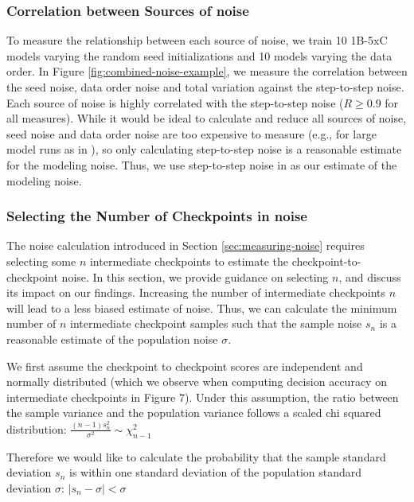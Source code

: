 \subsubsection{Correlation between Sources of noise{}}
\label{app:measuring-noise-sources}

To measure the relationship between each source of noise{}, we train 10 1B-5xC models varying the random seed initializations and 10 models varying the data order. In Figure \ref{fig:combined-noise-example}, we measure the correlation between the seed noise{}, data order noise{} and total variation against the step-to-step noise{}. Each source of noise{} is highly correlated with the step-to-step noise{} ($R\ge0.9$ for all measures). While it would be ideal to calculate and reduce all sources of noise{}, seed noise{} and data order noise{} are too expensive to measure (e.g., for large model runs as in \citet{madaan2024quantifying}), so only calculating step-to-step noise{} is a reasonable estimate for the modeling noise{}. Thus, we use step-to-step noise{} in as our estimate of the modeling noise.

\subsubsection{Selecting the Number of Checkpoints in noise{}}
\label{app:selecting-n-in-noise}

The noise calculation introduced in Section \ref{sec:measuring-noise} requires selecting some $n$ intermediate checkpoints to estimate the checkpoint-to-checkpoint noise. In this section, we provide guidance on selecting $n$, and discuss its impact on our findings. Increasing the number of intermediate checkpoints $n$ will lead to a less biased estimate of noise. Thus, we can calculate the minimum number of $n$ intermediate checkpoint samples such that the sample noise $s_n$ is a reasonable estimate of the population noise $\sigma$.


We first assume the checkpoint to checkpoint scores are independent and normally distributed (which we observe when computing decision accuracy on intermediate checkpoints in Figure 7). Under this assumption, the ratio between the sample variance and the population variance follows a scaled chi squared distribution: $\frac{(n-1)s_n^2}{\sigma^2} \sim \chi^2_{n-1}$

Therefore we would like to calculate the probability that the sample standard deviation $s_n$ is within one standard deviation of the population standard deviation $\sigma$: $|s_n - \sigma| < \sigma$


